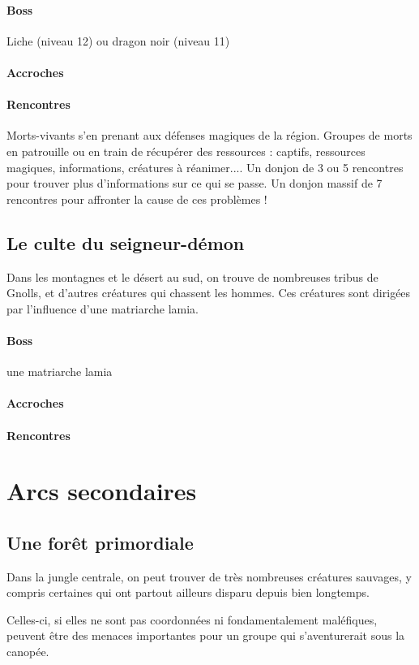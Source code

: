 \documentclass[10pt,a4paper]{book}
\begin{document}
\paragraph{Boss} Liche (niveau 12) ou dragon noir (niveau 11)
\paragraph{Accroches}
\paragraph{Rencontres} Morts-vivants s'en prenant aux défenses magiques de la région. Groupes de morts en patrouille ou en train de récupérer des ressources : captifs, ressources magiques, informations, créatures à réanimer.... Un donjon de 3 ou 5 rencontres pour trouver plus d'informations sur ce qui se passe. Un donjon massif de 7 rencontres pour affronter la cause de ces problèmes !
\subsection{Le culte du seigneur-démon}
Dans les montagnes et le désert au sud, on trouve de nombreuses tribus de Gnolls, et d'autres créatures qui chassent les hommes. Ces créatures sont dirigées par l'influence d'une matriarche lamia.
\paragraph{Boss}une matriarche lamia
\paragraph{Accroches}
\paragraph{Rencontres}
\section{Arcs secondaires}
\subsection{Une forêt primordiale}
Dans la jungle centrale, on peut trouver de très nombreuses créatures sauvages, y compris certaines qui ont partout ailleurs disparu depuis bien longtemps.

Celles-ci, si elles ne sont pas coordonnées ni fondamentalement maléfiques, peuvent être des menaces importantes pour un groupe qui s'aventurerait sous la canopée.
\end{document}
